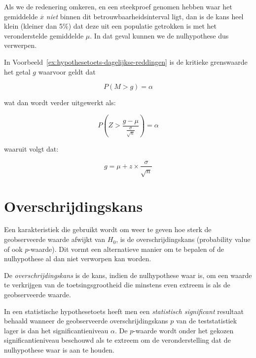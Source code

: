 Als we de redenering omkeren, en een steekproef genomen hebben waar het gemiddelde $\overline{x}$ \emph{niet} binnen dit betrouwbaarheidsinterval ligt, dan is de kans heel klein (kleiner dan 5\%) dat deze uit een populatie getrokken is met het veronderstelde gemiddelde $\mu$. In dat geval kunnen we de nulhypothese dus verwerpen.

In Voorbeeld~\ref{ex:hypothesetoets-dagelijkse-reddingen} is de kritieke grenswaarde het getal $g$ waarvoor geldt dat

\[ P(M > g) = \alpha \]

wat dan wordt verder uitgewerkt als:

\[ P(Z > \frac{g - \mu}{\frac{\sigma}{\sqrt{n}}}) = \alpha \]

waaruit volgt dat:

\begin{equation}
  \label{eq:kritieke-waarde-rechtszijdig}
  g = \mu + z \times \frac{\sigma}{\sqrt{n}}
\end{equation}

\section{Overschrijdingskans}
\label{sec:overschrijdingskans}

Een karakteristiek die gebruikt wordt om weer te geven hoe sterk de geobserveerde waarde afwijkt van $H_{0}$, is de overschrijdingskans (probability value of ook $p$-waarde). Dit vormt een alternatieve manier om te bepalen of de nulhypothese al dan niet verworpen kan worden.

\begin{definition}[overschrijdingskans]
  De \emph{overschrijdingskans} is de kans, indien de nulhypothese waar is, om een waarde te verkrijgen van de toetsingsgrootheid die minstens even extreem is als de geobserveerde waarde.
\end{definition}

\begin{definition}
  In een statistische hypothesetoets heeft men een \emph{statistisch significant} resultaat behaald wanneer de geobserveerde overschrijdingskans $p$ van de teststatistiek lager is dan het significantieniveau $\alpha$. De $p$-waarde wordt onder het gekozen significantieniveau beschouwd als te extreem om de veronderstelling dat de nulhypothese waar is aan te houden.
\end{definition}


